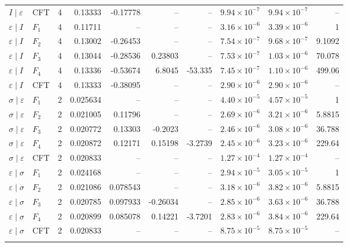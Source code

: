 \begin{longtable}{llcrrrrrrr}
$I\mid \varepsilon$ & CFT & 4 & 0.13333 & -0.17778 & -- & -- & $9.94\!\times\!10^{-7}$ & $9.94\!\times\!10^{-7}$ & -- \\
\addlinespace[3pt]
$\varepsilon\mid I$ & $F_1$ & 4 & 0.11711 & -- & -- & -- & $3.16\!\times\!10^{-6}$ & $3.39\!\times\!10^{-6}$ & 1 \\*
$\varepsilon\mid I$ & $F_2$ & 4 & 0.13002 & -0.26453 & -- & -- & $7.54\!\times\!10^{-7}$ & $9.68\!\times\!10^{-7}$ & 9.1092 \\*
$\varepsilon\mid I$ & $F_3$ & 4 & 0.13044 & -0.28536 & 0.23803 & -- & $7.53\!\times\!10^{-7}$ & $1.03\!\times\!10^{-6}$ & 70.078 \\*
$\varepsilon\mid I$ & $F_4$ & 4 & 0.13336 & -0.53674 & 6.8045 & -53.335 & $7.45\!\times\!10^{-7}$ & $1.10\!\times\!10^{-6}$ & 499.06 \\*
$\varepsilon\mid I$ & CFT & 4 & 0.13333 & -0.38095 & -- & -- & $2.90\!\times\!10^{-6}$ & $2.90\!\times\!10^{-6}$ & -- \\
\addlinespace[3pt]
$\sigma\mid \varepsilon$ & $F_1$ & 2 & 0.025634 & -- & -- & -- & $4.40\!\times\!10^{-5}$ & $4.57\!\times\!10^{-5}$ & 1 \\*
$\sigma\mid \varepsilon$ & $F_2$ & 2 & 0.021005 & 0.11796 & -- & -- & $2.69\!\times\!10^{-6}$ & $3.21\!\times\!10^{-6}$ & 5.8815 \\*
$\sigma\mid \varepsilon$ & $F_3$ & 2 & 0.020772 & 0.13303 & -0.2023 & -- & $2.46\!\times\!10^{-6}$ & $3.08\!\times\!10^{-6}$ & 36.788 \\*
$\sigma\mid \varepsilon$ & $F_4$ & 2 & 0.020872 & 0.12171 & 0.15198 & -3.2739 & $2.45\!\times\!10^{-6}$ & $3.23\!\times\!10^{-6}$ & 229.64 \\*
$\sigma\mid \varepsilon$ & CFT & 2 & 0.020833 & -- & -- & -- & $1.27\!\times\!10^{-4}$ & $1.27\!\times\!10^{-4}$ & -- \\
\addlinespace[3pt]
$\varepsilon\mid \sigma$ & $F_1$ & 2 & 0.024168 & -- & -- & -- & $2.94\!\times\!10^{-5}$ & $3.05\!\times\!10^{-5}$ & 1 \\*
$\varepsilon\mid \sigma$ & $F_2$ & 2 & 0.021086 & 0.078543 & -- & -- & $3.18\!\times\!10^{-6}$ & $3.82\!\times\!10^{-6}$ & 5.8815 \\*
$\varepsilon\mid \sigma$ & $F_3$ & 2 & 0.020785 & 0.097933 & -0.26034 & -- & $2.85\!\times\!10^{-6}$ & $3.63\!\times\!10^{-6}$ & 36.788 \\*
$\varepsilon\mid \sigma$ & $F_4$ & 2 & 0.020899 & 0.085078 & 0.14221 & -3.7201 & $2.83\!\times\!10^{-6}$ & $3.84\!\times\!10^{-6}$ & 229.64 \\*
$\varepsilon\mid \sigma$ & CFT & 2 & 0.020833 & -- & -- & -- & $8.75\!\times\!10^{-5}$ & $8.75\!\times\!10^{-5}$ & -- \\
\addlinespace[3pt]
\bottomrule\end{longtable}
